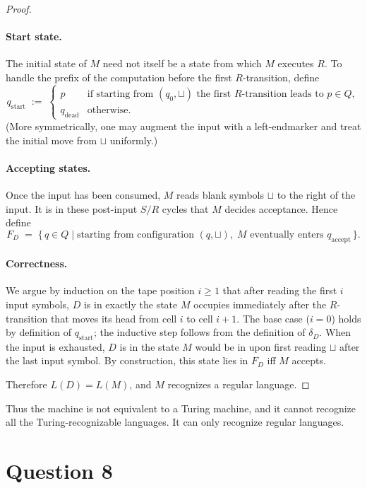 \documentclass[a4paper, UTF-8]{article}
\theoremstyle{plain}
\begin{document}
\begin{proof}
    \paragraph{Start state.}
    The initial state of $M$ need not itself be a state from which $M$ executes $R$.
    To handle the prefix of the computation before the first $R$-transition, define
    \[
        q_{\text{start}} \;:=\;
        \begin{cases}
            p & \text{if starting from }(q_0, \sqcup)\text{ the first }R\text{-transition leads to }p \in Q,\\
            q_{\text{dead}} & \text{otherwise.}
        \end{cases}
    \]
    (More symmetrically, one may augment the input with a left-endmarker and treat the initial move from $\sqcup$ uniformly.)

    \paragraph{Accepting states.}
    Once the input has been consumed, $M$ reads blank symbols $\sqcup$ to the right of the input.  It is in these post-input $S/R$ cycles that $M$ decides acceptance.  Hence define
    \[
        F_D \;=\; \{\, q \in Q \mid \text{starting from configuration }(q, \sqcup),\; M\text{ eventually enters }q_{\text{accept}} \,\}.
    \]

    \paragraph{Correctness.}
    We argue by induction on the tape position $i \geq 1$ that after reading the first $i$ input symbols, $D$ is in exactly the state $M$ occupies immediately after the $R$-transition that moves its head from cell $i$ to cell $i+1$.  The base case ($i=0$) holds by definition of $q_{\text{start}}$; the inductive step follows from the definition of $\delta_D$.  When the input is exhausted, $D$ is in the state $M$ would be in upon first reading $\sqcup$ after the last input symbol.  By construction, this state lies in $F_D$ iff $M$ accepts.

    Therefore $L(D) = L(M)$, and $M$ recognizes a regular language.
\end{proof}

Thus the machine is not equivalent to a Turing machine, and it cannot recognize all the Turing-recognizable languages. It can only recognize regular languages.

\section{Question 8} 
\end{document}
